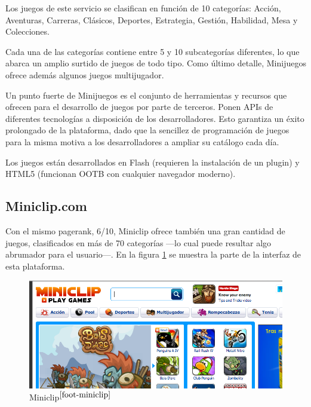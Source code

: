 Los juegos de este servicio se clasifican en función de 10 categorías: Acción, Aventuras, Carreras, Clásicos, Deportes, Estrategia, Gestión, Habilidad, Mesa y Colecciones.

Cada una de las categorías contiene entre 5 y 10 subcategorías diferentes, lo que abarca un amplio surtido de juegos de todo tipo. Como último detalle, Minijuegos ofrece además algunos juegos multijugador.


Un punto fuerte de Minijuegos es el conjunto de herramientas y recursos que ofrecen para el desarrollo de juegos por parte de terceros. Ponen \acs{API}s de diferentes tecnologías a disposición de los desarrolladores. Esto garantiza un éxito prolongado de la plataforma, dado que la sencillez de programación de juegos para la misma motiva a los desarrolladores a ampliar su catálogo cada día.

Los juegos están desarrollados en Flash (requieren la instalación de un plugin) y HTML5 (funcionan \acs{OOTB} con cualquier navegador moderno).

\subsection*{Miniclip.com}

Con el mismo pagerank, 6/10, Miniclip ofrece también una gran cantidad de juegos, clasificados en más de 70 categorías ---lo cual puede resultar algo abrumador para el usuario---. En la figura \ref{fig::miniclip} se muestra la parte de la interfaz de esta plataforma.

\begin{figure}
  \begin{center}
    \includegraphics[width=\textwidth]{images/miniclip.png}
    \caption[Miniclip]{Miniclip$^{\ref{foot-miniclip}}$}
    \label{fig::miniclip}
  \end{center}
\end{figure}
\addtocounter{footnote}{1}\footnotetext{\label{foot-miniclip}{\tt http://www.miniclip.com}}

